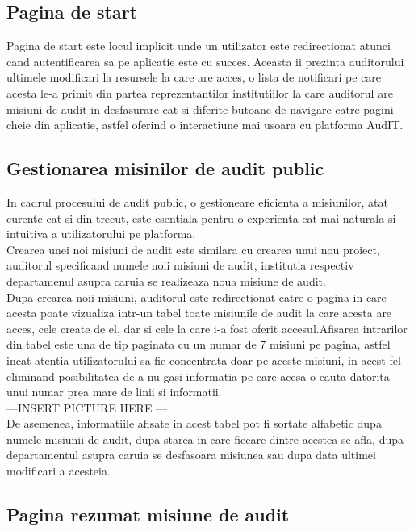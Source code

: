 \subsection{Pagina de start}
Pagina de start este locul implicit unde un utilizator este redirectionat atunci cand autentificarea sa pe aplicatie este cu succes. Aceasta ii prezinta auditorului ultimele modificari la resursele la care are acces, o lista de notificari pe care acesta le-a primit din partea reprezentantilor institutiilor la care auditorul are misiuni de audit in desfasurare cat si diferite butoane de navigare catre pagini cheie din aplicatie, astfel oferind o interactiune mai usoara cu platforma AudIT.

\subsection{Gestionarea misinilor de audit public}
In cadrul procesului de audit public, o gestioneare eficienta a misiunilor, atat curente cat si din trecut, este esentiala pentru o experienta cat mai naturala si intuitiva a utilizatorului pe platforma.\\
Crearea unei noi misiuni de audit este similara cu crearea unui nou proiect, auditorul specificand numele noii misiuni de audit, institutia respectiv departamenul asupra caruia se realizeaza noua misiune de audit. \\
Dupa crearea noii misiuni, auditorul este redirectionat catre o pagina in care acesta poate vizualiza intr-un tabel toate misiunile de audit la care acesta are acces, cele create de el, dar si cele la care i-a fost oferit accesul.Afisarea intrarilor din tabel este una de tip paginata cu un numar de 7 misiuni pe pagina, astfel incat atentia utilizatorului sa fie concentrata doar pe aceste misiuni, in acest fel eliminand posibilitatea de a nu gasi informatia pe care acesa o cauta datorita unui numar prea mare de linii si informatii.\\
---INSERT PICTURE HERE ---\\
De asemenea, informatiile afisate in acest tabel pot fi sortate alfabetic dupa numele misiunii de audit, dupa starea in care fiecare dintre acestea se afla, dupa departamentul asupra caruia se desfasoara misiunea  sau dupa data ultimei modificari a acesteia.

\subsection{Pagina rezumat misiune de audit}

